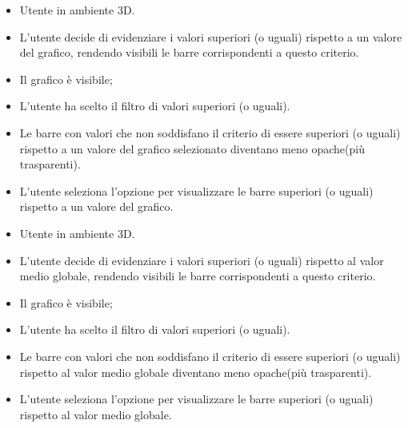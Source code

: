 \UCdsc
{ %
    \begin{itemize}
        \item Utente in ambiente 3D.
    \end{itemize}
}
{ %
    \begin{itemize}
        \item L'utente decide di evidenziare i valori superiori (o uguali) rispetto a un valore del grafico, rendendo visibili le barre corrispondenti a questo criterio.
    \end{itemize}
}
{ %
    \begin{itemize}
        \item Il grafico è visibile;
        \item L'utente ha scelto il filtro di valori superiori (o uguali).
    \end{itemize}
}
{ %
    \begin{itemize}
        \item Le barre con valori che non soddisfano il criterio di essere superiori (o uguali) rispetto a un valore del grafico selezionato diventano meno opache(più trasparenti).
    \end{itemize}
}
{ %
    \begin{itemize}
        \item L'utente seleziona l'opzione per visualizzare le barre superiori (o uguali) rispetto a un valore del grafico.
    \end{itemize}
}


\UCdsc
{ %
    \begin{itemize}
        \item Utente in ambiente 3D.
    \end{itemize}
}
{ %
    \begin{itemize}
        \item L'utente decide di evidenziare i valori superiori (o uguali) rispetto al valor medio globale, rendendo visibili le barre corrispondenti a questo criterio.
    \end{itemize}
}
{ %
    \begin{itemize}
        \item Il grafico è visibile;
        \item L'utente ha scelto il filtro di valori superiori (o uguali).
    \end{itemize}
}
{ %
    \begin{itemize}
        \item Le barre con valori che non soddisfano il criterio di essere superiori (o uguali) rispetto al valor medio globale diventano meno opache(più trasparenti).
    \end{itemize}
}
{ %
    \begin{itemize}
        \item L'utente seleziona l'opzione per visualizzare le barre superiori (o uguali) rispetto al valor medio globale.
    \end{itemize}
}




